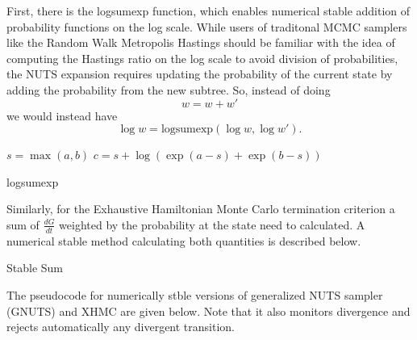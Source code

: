 \documentclass[12pt]{report}
\begin{document}
First, there is the logsumexp function, which enables numerical stable addition of probability functions on the log scale. While users of traditonal MCMC samplers like the Random Walk Metropolis Hastings should be familiar with the idea of computing the Hastings ratio on the log scale to avoid division of probabilities, the NUTS expansion requires updating the probability of the current state by adding the probability from the new subtree. So, instead of doing 
\[ w = w + w' \] 
we would instead have
\[ \log w = \text{logsumexp}(\log w, \log w' ). \]

\begin{algorithm}
\DontPrintSemicolon
{}
$s = \max(a,b) $\;
$c = s + \log( \exp(a-s) + \exp(b-s)) $\;

\caption{logsumexp}
\end{algorithm}

Similarly, for the Exhaustive Hamiltonian Monte Carlo termination criterion a sum of $\frac{dG}{dt}$ weighted by the probability at the state need to calculated. A numerical stable method calculating both quantities is described below.

\begin{algorithm}
\DontPrintSemicolon
{}

\caption{Stable Sum }
\end{algorithm}

The pseudocode for numerically stble versions of generalized NUTS sampler (GNUTS) and XHMC are given below. Note that it also monitors divergence and rejects automatically any divergent transition.
\end{document}
